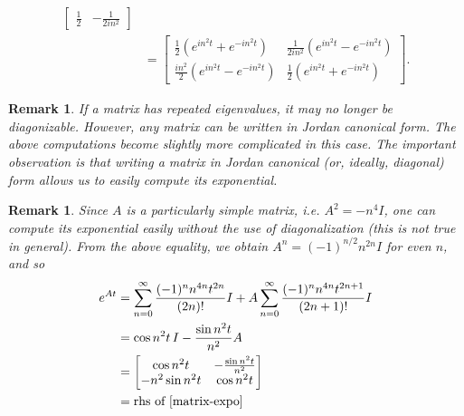 \documentclass[12pt,reqno]{amsart}
\numberwithin{equation}{section}  %
\renewcommand{\cref}{\Cref}
\newtheorem{remark}[theorem]{Remark}
\begin{document}
\begin{appendices}
\begin{equation}
\begin{split}
\begin{bmatrix}
    \frac{1}{2} & -\frac{1}{2i n^{2} }
  \end{bmatrix}
  \\
  & =
  \begin{bmatrix}
    \frac{1}{2}(e^{in^{2}t} + e^{-in^{2}t}) & \frac{1}{2 i n^{2}} (e^{in^{2}t} -
    e^{-in^{2}t})    \\
    \frac{in^{2}}{2}(e^{in^{2}t} - e^{-in^{2}t}) & \frac{1}{2}(e^{in^{2}t} +
    e^{-in^{2}t})
  \end{bmatrix}.
\end{split}
\end{equation}
%
%
\begin{framed}
\begin{remark}
If a matrix has repeated eigenvalues, it may no longer be diagonizable. However,
any matrix can be written in Jordan canonical form. The above computations
become slightly more complicated in this case. The important observation is that
writing a matrix in Jordan canonical (or, ideally, diagonal) form allows us to
easily compute its exponential. 
\label{rem:jordan-form}
\end{remark}
\end{framed}
%
%
%
%
\begin{framed}
\begin{remark}
\label{rem:simpler-comp}
  Since $A$ is a particularly simple matrix, i.e. $A^{2} = -n^{4} I$, one can
  compute its exponential easily without the use of diagonalization (this is
  not true in general). From the above equality, we obtain $A^{n} =
  (-1)^{n/2} n^{2n} I$ for even $n$, and so
  \begin{equation*}
  \begin{split}
    e^{At}
    & = \sum_{n=0}^{\infty} \frac{(-1)^{n}n^{4n}t^{2n}}{(2n)!}I + A
    \sum_{n=0}^{\infty} \frac{(-1)^{n} n^{4n} t^{2n + 1}}{(2n + 1)!} I 
    \\
    & = \cos n^{2}t \, I - \frac{\sin n^{2}t}{n^{2}}A
    \\
    & = 
    \begin{bmatrix}
      \cos n^{2}t &  -\frac{\sin n^{2}t}{n^{2}}
      \\
      - n^{2} \sin n^{2}t & \cos n^{2}t
    \end{bmatrix}
    \\
    & = \text{rhs of }\cref{matrix-expo}
  \end{split}
  \end{equation*}
\end{remark}
\end{framed}

\end{appendices}
\end{document}
